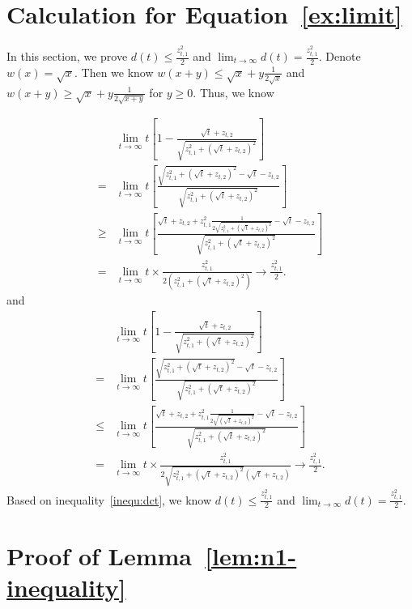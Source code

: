 \section*{Calculation for Equation~\eqref{ex:limit}}

In this section, we prove $d(t)\leq \frac{z_{t,1}^{2}}{2}$ and $\lim_{t\rightarrow\infty}d(t)=\frac{z_{t,1}^2}{2}$. Denote $w(x)=\sqrt{x}$. Then we know $w(x+y)\leq \sqrt{x} + y\frac{1}{2\sqrt{x}}$ and $w(x+y)\geq \sqrt{x} + y\frac{1}{2\sqrt{x+y}}$ for $y\geq 0$. Thus, we know

\begin{align}
&\lim_{t\rightarrow\infty} t\left[1-\frac{\sqrt{t}+z_{t,2}}{\sqrt{z_{t,1}^2+(\sqrt{t}+z_{t,2})^2}}\right] \nonumber \\
=& \lim_{t\rightarrow\infty} t\left[\frac{\sqrt{z_{t,1}^2+(\sqrt{t}+z_{t,2})^2}-\sqrt{t}-z_{t,2}}{\sqrt{z_{t,1}^2+(\sqrt{t}+z_{t,2})^2}}\right]  \nonumber \\
\geq & \lim_{t\rightarrow\infty} t\left[\frac{\sqrt{t}+z_{t,2}+z_{t,1}^{2}\frac{1}{2\sqrt{z_{t,1}^2+(\sqrt{t}+z_{t,2})^2}}-\sqrt{t}-z_{t,2}}{\sqrt{z_{t,1}^2+(\sqrt{t}+z_{t,2})^2}}\right]  \nonumber \\
= & \lim_{t\rightarrow\infty} t \times \frac{z_{t,1}^2}{2(z_{t,1}^2+(\sqrt{t}+z_{t,2})^2)} \rightarrow \frac{z_{t,1}^2}{2}. \nonumber 
\end{align}
and
\begin{align}
&\lim_{t\rightarrow\infty} t\left[1-\frac{\sqrt{t}+z_{t,2}}{\sqrt{z_{t,1}^2+(\sqrt{t}+z_{t,2})^2}}\right] \nonumber \\
=& \lim_{t\rightarrow\infty} t\left[\frac{\sqrt{z_{t,1}^2+(\sqrt{t}+z_{t,2})^2}-\sqrt{t}-z_{t,2}}{\sqrt{z_{t,1}^2+(\sqrt{t}+z_{t,2})^2}}\right]  \nonumber \\
\leq & \lim_{t\rightarrow\infty} t\left[\frac{\sqrt{t}+z_{t,2}+z_{t,1}^{2}\frac{1}{2\sqrt{(\sqrt{t}+z_{t,2})^2}}-\sqrt{t}-z_{t,2}}{\sqrt{z_{t,1}^2+(\sqrt{t}+z_{t,2})^2}}\right]  \nonumber \\
= & \lim_{t\rightarrow\infty} t \times \frac{z_{t,1}^2}{2\sqrt{z_{t,1}^2+(\sqrt{t}+z_{t,2})^2}(\sqrt{t}+z_{t,2})} \rightarrow \frac{z_{t,1}^2}{2}. \label{inequ:dct}
\end{align}   
Based on inequality~\eqref{inequ:dct}, we know $d(t)\leq \frac{z_{t,1}^{2}}{2}$ and $\lim_{t\rightarrow\infty}d(t)=\frac{z_{t,1}^2}{2}$.

\section*{Proof of Lemma~\ref{lem:n1-inequality}}

